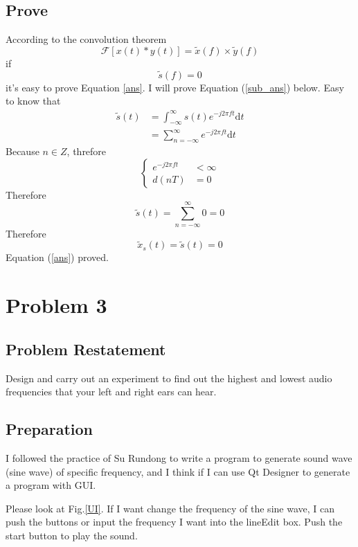 \documentclass{article}
\begin{document}
\subsection{Prove}
According to the convolution theorem
\begin{equation*}
    \mathcal{F}\left[ x(t)*y(t) \right] = \widetilde{x}(f) \times \widetilde{y}(f)
\end{equation*}
if 
\begin{equation}
    \widetilde{s}(f) = 0
    \label{sub_ans}
\end{equation}
it's easy to prove Equation \ref{ans}.
I will prove Equation (\ref{sub_ans}) below. Easy to know that
\begin{align*}
    \widetilde{s}(t) &= \int_{-\infty}^{\infty} s(t) e^{-j2\pi ft} \mathrm{d}t\\
    &= \sum_{n = -\infty}^{\infty} e^{-j2\pi ft} \mathrm{d}t
\end{align*}
Because $n \in Z$, threfore
$$
\left\{
    \begin{array}{rl}
    e^{-j2\pi ft} &< \infty\\
    d(nT) &= 0
    \end{array}
\right.
$$
Therefore
\begin{equation*}
    \widetilde{s}(t) = \sum_{n = -\infty}^{\infty} 0 = 0
\end{equation*}
Therefore
\begin{equation*}
    \widetilde{x}_s(t) = \widetilde{s}(t) = 0
\end{equation*}
Equation (\ref{ans}) proved.
\section{Problem 3}
\subsection{Problem Restatement}
Design and carry out an experiment to find out the highest and lowest audio frequencies that your left and right ears can
hear.
\subsection{Preparation}
I followed the practice of Su Rundong to write a program to generate sound wave (sine wave) of specific frequency, and I think if I can use Qt Designer to generate a program with GUI.

Please look at Fig.\ref{UI}. If I want change the frequency of the sine wave, I can push the buttons or input the frequency I want into the lineEdit box. Push the start button to play the sound.
\end{document}
